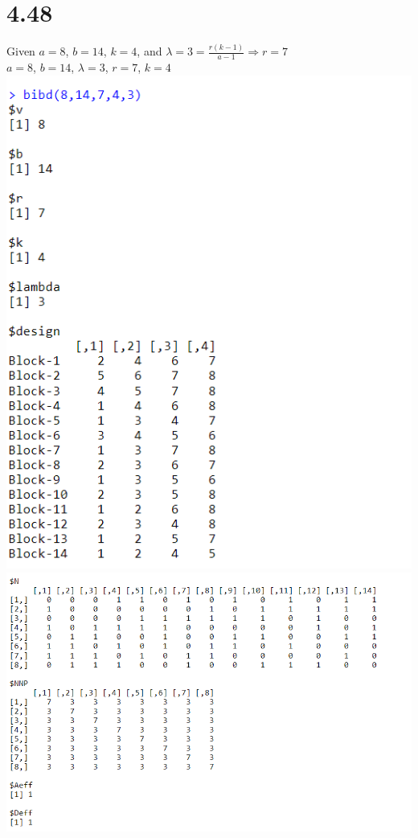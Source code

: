 \documentclass{article}
\begin{document}
\section*{4.48}
Given $a = 8$, $b = 14$, $k = 4$, and $\lambda = 3 = \frac{r(k-1)}{a-1} \Rightarrow r = 7$ 
\\$a = 8$, $b = 14$, $\lambda = 3$, $r = 7$, $k = 4$
\\\includegraphics{4.48a.PNG}
\\\includegraphics{4.48b.PNG}
\end{document}
